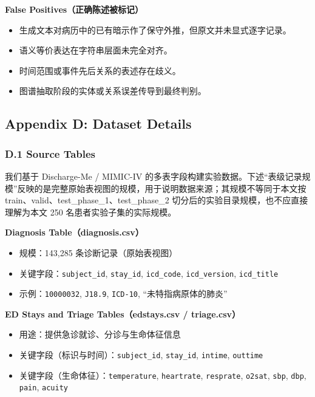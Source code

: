 \documentclass[11pt]{article}
\providecommand{\tightlist}{\setlength{\itemsep}{0pt}\setlength{\parskip}{0pt}}
\begin{document}
\textbf{False Positives（正确陈述被标记）}

\begin{itemize}
\tightlist
\item
  生成文本对病历中的已有暗示作了保守外推，但原文并未显式逐字记录。
\item
  语义等价表达在字符串层面未完全对齐。
\item
  时间范围或事件先后关系的表述存在歧义。
\item
  图谱抽取阶段的实体或关系误差传导到最终判别。
\end{itemize}

\subsection{Appendix D: Dataset Details}

\subsubsection{D.1 Source Tables}

我们基于 Discharge-Me / MIMIC-IV 的多表字段构建实验数据。下述``表级记录规模''反映的是完整原始表视图的规模，用于说明数据来源；其规模不等同于本文按 train、valid、test\_phase\_1、test\_phase\_2 切分后的实验目录规模，也不应直接理解为本文 250 名患者实验子集的实际规模。

\textbf{Diagnosis Table（diagnosis.csv）}

\begin{itemize}
\tightlist
\item
  规模：143,285 条诊断记录（原始表视图）
\item
  关键字段：\texttt{subject\_id}, \texttt{stay\_id}, \texttt{icd\_code}, \texttt{icd\_version}, \texttt{icd\_title}
\item
  示例：\texttt{10000032}, \texttt{J18.9}, \texttt{ICD-10}, ``未特指病原体的肺炎''
\end{itemize}

\textbf{ED Stays and Triage Tables（edstays.csv / triage.csv）}

\begin{itemize}
\tightlist
\item
  用途：提供急诊就诊、分诊与生命体征信息
\item
  关键字段（标识与时间）：\texttt{subject\_id}, \texttt{stay\_id}, \texttt{intime}, \texttt{outtime}
\item
  关键字段（生命体征）：\texttt{temperature}, \texttt{heartrate}, \texttt{resprate}, \texttt{o2sat}, \texttt{sbp}, \texttt{dbp}, \texttt{pain}, \texttt{acuity}
\end{itemize}
\end{document}
